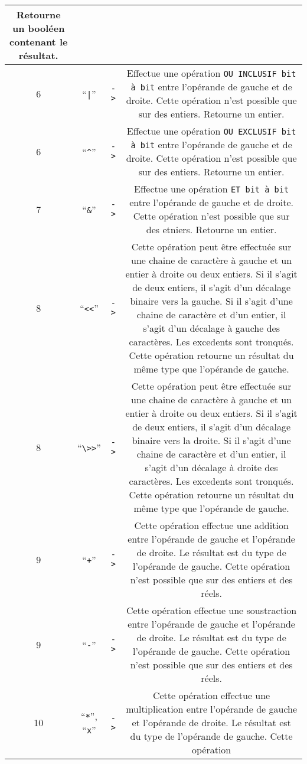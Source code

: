 \documentclass[a5paper, 12pt]{book}
\begin{document}
\begin{tabular}{c|c|c|c}
  Retourne un booléen contenant le résultat.\\
  \hline
  6 & ``\verb!|!'' & \verb!->! &
  Effectue une opération \verb!OU INCLUSIF bit à bit! entre l'opérande de gauche et de droite.
  Cette opération n'est possible que sur des entiers. Retourne un entier.\\
  6 & ``\verb!^!'' & \verb!->! &
  Effectue une opération \verb!OU EXCLUSIF bit à bit! entre l'opérande de gauche et de droite.
  Cette opération n'est possible que sur des entiers. Retourne un entier.\\
  \hline
  7 & ``\verb!&!'' & \verb!->! &
  Effectue une opération \verb!ET bit à bit! entre l'opérande de gauche et de droite.
  Cette opération n'est possible que sur des etniers. Retourne un entier.\\
  \hline
  8 & ``\verb!<<!'' & \verb!->! &
  Cette opération peut être effectuée sur une chaine de caractère à gauche et
  un entier à droite ou deux entiers.
  Si il s'agit de deux entiers, il s'agit d'un décalage binaire vers la gauche.
  Si il s'agit d'une chaine de caractère et d'un entier, il s'agit d'un décalage
  à gauche des caractères.
  Les excedents sont tronqués.
  Cette opération retourne un résultat du même type que l'opérande de gauche.\\
  8 & ``\verb!\>>!'' & \verb!->! &
  Cette opération peut être effectuée sur une chaine de caractère à gauche et
  un entier à droite ou deux entiers.
  Si il s'agit de deux entiers, il s'agit d'un décalage binaire vers la droite.
  Si il s'agit d'une chaine de caractère et d'un entier, il s'agit d'un décalage
  à droite des caractères.
  Les excedents sont tronqués.
  Cette opération retourne un résultat du même type que l'opérande de gauche.\\
  \hline
  9 & ``\verb!+!'' & \verb!->! &
  Cette opération effectue une addition entre l'opérande de gauche et l'opérande
  de droite. Le résultat est du type de l'opérande de gauche. Cette opération
  n'est possible que sur des entiers et des réels.\\
  9 & ``\verb!-!'' & \verb!->! &
  Cette opération effectue une soustraction entre l'opérande de gauche et l'opérande
  de droite. Le résultat est du type de l'opérande de gauche. Cette opération
  n'est possible que sur des entiers et des réels.\\
  \hline
  10 & ``\verb!*!'', ``\verb!x!'' & \verb!->! &
  Cette opération effectue une multiplication entre l'opérande de gauche et l'opérande
  de droite. Le résultat est du type de l'opérande de gauche. Cette opération

\end{tabular}
\end{document}
